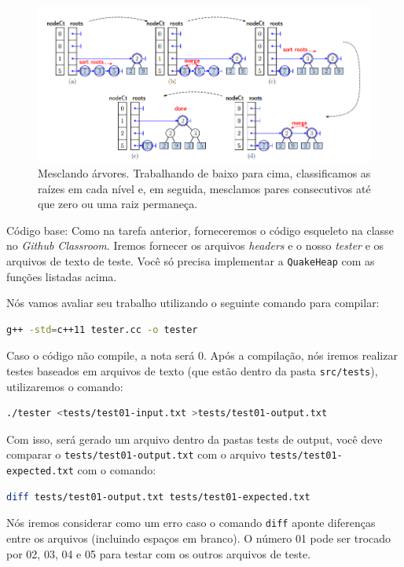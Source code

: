 \documentclass{article}
\begin{document}
\begin{figure}
    \centering
    \includegraphics[width = \linewidth]{figures/fig2.png}
    \caption{Mesclando árvores. Trabalhando de baixo para cima, classificamos as raízes em cada nível e, em seguida, mesclamos pares consecutivos até que zero ou uma raiz permaneça.}
    \label{fig:fig2}
\end{figure}

Código base: Como na tarefa anterior, forneceremos o código esqueleto na classe no \textit{Github Classroom}. Iremos fornecer os arquivos \textit{headers} e o nosso \textit{tester} e os arquivos de texto de teste. Você só precisa implementar a \texttt{QuakeHeap} com as funções listadas acima. 

Nós vamos avaliar seu trabalho utilizando o seguinte comando para compilar:
\begin{lstlisting}[language=bash]
g++ -std=c++11 tester.cc -o tester
\end{lstlisting}

Caso o código não compile, a nota será 0.
Após a compilação, nós iremos realizar testes baseados em arquivos de texto (que estão dentro da pasta \texttt{src/tests}), utilizaremos o comando:

\begin{lstlisting}[language=bash]
./tester <tests/test01-input.txt >tests/test01-output.txt
\end{lstlisting}
    
Com isso, será gerado um arquivo dentro da pastas tests de output, você deve comparar o \texttt{tests/test01-output.txt} com o arquivo \texttt{tests/test01-expected.txt} com o comando:

\begin{lstlisting}[language=bash]
diff tests/test01-output.txt tests/test01-expected.txt
\end{lstlisting}

Nós iremos considerar como um erro caso o comando \texttt{diff} aponte diferenças entre os arquivos (incluindo espaços em branco). 
O número 01 pode ser trocado por 02, 03, 04 e 05 para testar com os outros arquivos de teste. 
\end{document}
